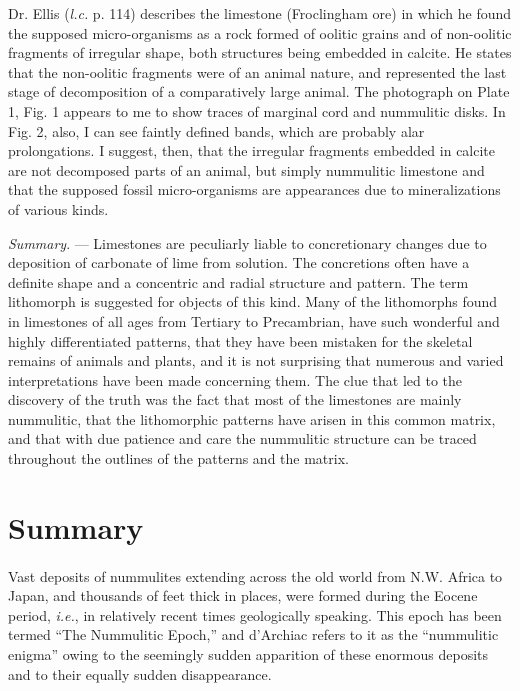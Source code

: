 \documentclass[a4paper, 12pt, oneside]{article}
\begin{document}
Dr. Ellis (\emph{l.c.} p. 114) describes the limestone (Froclingham ore) in which he found the supposed micro-organisms as a rock formed of oolitic grains and of non-oolitic fragments of irregular shape, both structures being embedded in calcite. He states that the non-oolitic fragments were of an animal nature, and represented the last stage of decomposition of a comparatively large animal. The photograph on Plate 1, Fig. 1 appears to me to show traces of marginal cord and nummulitic disks. In Fig. 2, also, I can see faintly defined bands, which are probably alar prolongations. I suggest, then, that the irregular fragments embedded in calcite are not decomposed parts of an animal, but simply nummulitic limestone and that the supposed fossil micro-organisms are appearances due to mineralizations of various kinds.

\emph{Summary}. --- Limestones are peculiarly liable to concretionary changes due to deposition of carbonate of lime from solution. The concretions often have a definite shape and a concentric and radial structure and pattern. The term lithomorph is suggested for objects of this kind. Many of the lithomorphs found in limestones of all ages from Tertiary to Precambrian, have such wonderful and highly differentiated patterns, that they have been mistaken for the skeletal remains of animals and plants, and it is not surprising that numerous and varied interpretations have been made concerning them. The clue that led to the discovery of the truth was the fact that most of the limestones are mainly nummulitic, that the lithomorphic patterns have arisen in this common matrix, and that with due patience and care the nummulitic structure can be traced throughout the outlines of the patterns and the matrix.
\clearpage
\section{Summary}
\paragraph{}
Vast deposits of nummulites extending across the old world from N.W. Africa to Japan, and thousands of feet thick in places, were formed during the Eocene period, \emph{i.e.}, in relatively recent times geologically speaking. This epoch has been termed ``The Nummulitic Epoch,'' and d'Archiac refers to it as the ``nummulitic enigma'' owing to the seemingly sudden apparition of these enormous deposits and to their equally sudden disappearance.
\end{document}
